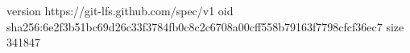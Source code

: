 version https://git-lfs.github.com/spec/v1
oid sha256:6e2f3b51bc69d26c33f3784fb0c8c2c6708a00cff558b79163f7798cfcf36ec7
size 341847
